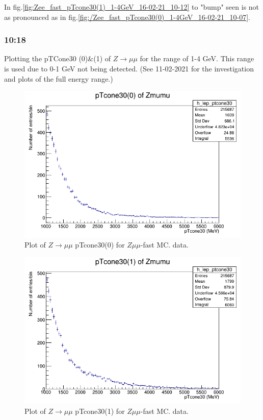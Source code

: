 In fig.\ref{fig:Zee_fast_pTcone30(1)_1-4GeV_16-02-21_10-12} to "bump" seen is not as pronounced as in fig.\ref{fig:/Zee_fast_pTcone30(0)_1-4GeV_16-02-21_10-07}.


\subsubsection*{10:18}
Plotting the pTCone30 (0)\&(1) of $Z\rightarrow \mu\mu$ for the range of 1-4 GeV. This range is used due to 0-1 GeV not being detected. (See 11-02-2021 for the investigation and plots of the full energy range.)

\begin{figure}[h!]
    \centering
    \includegraphics[width=0.85\linewidth]{plots/16-02-2021/Zmumu_fast_pTcone30(0)_1-6GeV_16-02-21_10-18.png}
    \caption{Plot of  $Z \rightarrow \mu\mu$ pTcone30(0) for $Z\mu\mu$-fast MC.  data.}\label{fig:Zmumu_fast_pTcone30(0)_1-6GeV_16-02-21_10-18}
\end{figure}

\begin{figure}[h!]
    \centering
    \includegraphics[width=0.85\linewidth]{plots/16-02-2021/Zmumu_fast_pTcone30(1)_1-6GeV_16-02-21_10-21.png}
    \caption{Plot of  $Z \rightarrow \mu\mu$ pTcone30(1) for $Z\mu\mu$-fast MC.  data.}\label{fig:Zmumu_fast_pTcone30(1)_1-6GeV_16-02-21_10-21}
\end{figure}


